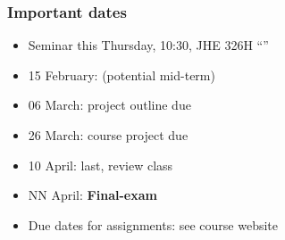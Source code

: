 \begin{frame}\frametitle{Important dates}
	\begin{itemize}
		\item	Seminar this Thursday, 10:30, JHE 326H ``\emph{{\color{myGreen}{Six Sigma for Chemical Engineers}}}''
		\item	15 February: (potential mid-term)
		\item	06 March: project outline due 
		\item	26 March: course project due
		\item	10 April: last, review class
		\item	NN April: \textbf{Final-exam }
	\end{itemize}
	\begin{itemize}
		\item	Due dates for assignments: see course website 
	\end{itemize}
\end{frame}

